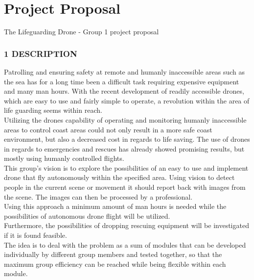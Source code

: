 \newpage

\chapter{Project Proposal}
\label{app:projectproposal}
The Lifeguarding Drone - Group 1 project proposal\\
\subsection*{1 DESCRIPTION}
Patrolling and ensuring safety at remote and humanly
 inaccessible areas such as the sea has for a long time been a difficult task requiring expensive equipment and many man hours. 
With the recent development of readily accessible drones, which are easy to use and fairly simple to operate, 
a revolution within the area of life guarding seems within reach.\\
Utilizing the drones capability of 
operating and monitoring humanly inaccessible areas
 to control coast areas could not only 
result in a more safe coast environment,
 but also a decreased cost in regards to life saving.
 The use of drones in regards to emergencies and
 rescues has already showed promising results, 
but mostly using humanly controlled flights.\\
This group's vision is to explore the possibilities
 of an easy to use and implement drone that fly 
autonomously within the specified area. Using vision to detect people in the current scene or movement it should report back with images from
the scene. The images can then be processed by
 a professional.\\ Using this approach a minimum
 amount of man hours is needed while the possibilities 
of autonomous drone flight will be utilized.\\ 
Furthermore, the possibilities of dropping rescuing
 equipment will be investigated if it is found feasible.\\
 The idea is to deal with the problem as a sum of modules
 that can be developed individually by different group
 members and tested together, so that the maximum group
 efficiency can be reached while being flexible within each module.\\
